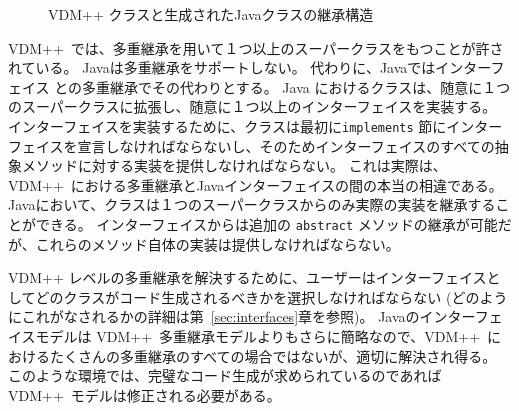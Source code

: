 \documentclass[\pformat,11pt]{jarticle}
\newcommand{\VDM}{VDM++}
\begin{document}
\begin{figure}[H]
\begin{center}
\quad
{}
\end{center}
\caption{VDM++ クラスと生成されたJavaクラスの継承構造}\label{fig:sortppjava}

\end{figure}

\VDM\ では、多重継承を用いて１つ以上のスーパークラスをもつことが許されている。
Javaは多重継承をサポートしない。
代わりに、Javaではインターフェイス \cite{Gosling&00}との多重継承でその代わりとする。
Java におけるクラスは、随意に１つのスーパークラスに拡張し、随意に１つ以上のインターフェイスを実装する。
インターフェイスを実装するために、クラスは最初に{\tt implements} 節にインターフェイスを宣言しなければならないし、そのためインターフェイスのすべての抽象メソッドに対する実装を提供しなければならない。
これは実際は、 \VDM\ における多重継承とJavaインターフェイスの間の本当の相違である。
Javaにおいて、クラスは１つのスーパークラスからのみ実際の実装を継承することができる。
インターフェイスからは追加の {\tt abstract} メソッドの継承が可能だが、これらのメソッド自体の実装は提供しなければならない。

 VDM++ レベルの多重継承を解決するために、ユーザーはインターフェイスとしてどのクラスがコード生成されるべきかを選択しなければならない (どのようにこれがなされるかの詳細は第~\ref{sec:interfaces}章を参照)。
Javaのインターフェイスモデルは \VDM\ 多重継承モデルよりもさらに簡略なので、\VDM\ におけるたくさんの多重継承のすべての場合ではないが、適切に解決され得る。
このような環境では、完璧なコード生成が求められているのであれば \VDM\ モデルは修正される必要がある。
\end{document}
